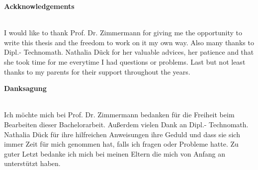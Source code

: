 

\begin{center}
\large \textbf{Ackknowledgements} \\
~\\ %


\end{center}
I would like to thank Prof. Dr. Zimmermann for giving me the opportunity to write this thesis and the freedom to work on it my own way. Also many thanks to Dipl.- Technomath. Nathalia Dück for her valuable advices, her patience and that she took time for me everytime I had questions or problems. Last but not least thanks to my parents for their support throughout the years. 

\vfill %
\begin{center}
\large \textbf{Danksagung} \\
~\\ %
\end{center}
Ich möchte mich bei Prof. Dr. Zimmermann bedanken für die Freiheit beim Bearbeiten dieser Bachelorarbeit. Außerdem vielen Dank an Dipl.- Technomath. Nathalia Dück für ihre hilfreichen Anweisungen ihre Geduld und dass sie sich immer Zeit für mich genommen hat, falls ich fragen oder Probleme hatte. Zu guter Letzt bedanke ich mich bei meinen Eltern die mich von Anfang an unterstützt haben.